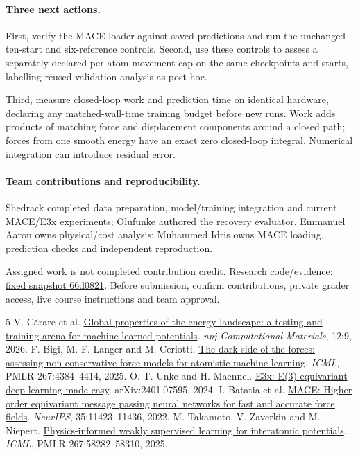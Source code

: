 \documentclass{article}
\begin{document}
\paragraph{Three next actions.}
First, verify the MACE loader against saved predictions and run the unchanged ten-start and six-reference controls. Second, use these controls to assess a separately declared per-atom movement cap on the same checkpoints and starts, labelling reused-validation analysis as post-hoc.

Third, measure closed-loop work and prediction time on identical hardware, declaring any matched-wall-time training budget before new runs. Work adds products of matching force and displacement components around a closed path; forces from one smooth energy have an exact zero closed-loop integral. Numerical integration can introduce residual error.
\paragraph{Team contributions and reproducibility.}
Shedrack completed data preparation, model/training integration and current MACE/E3x experiments; Olufunke authored the recovery evaluator. Emmanuel Aaron owns physical/cost analysis; Muhammed Idris owns MACE loading, prediction checks and independent reproduction.

Assigned work is not completed contribution credit. Research code/evidence: \href{https://github.com/Shedrackeze002/idl-molecular-force-consistency/tree/66d082158100a0c81b9a7815f7ac2a65f155b7ee}{fixed snapshot 66d0821}. Before submission, confirm contributions, private grader access, live course instructions and team approval.
\begin{thebibliography}{5}\small
{} V. C\u{a}rare et al. \href{https://doi.org/10.1038/s41524-025-01878-x}{Global properties of the energy landscape: a testing and training arena for machine learned potentials}. \emph{npj Computational Materials}, 12:9, 2026.
 F. Bigi, M. F. Langer and M. Ceriotti. \href{https://proceedings.mlr.press/v267/bigi25a.html}{The dark side of the forces: assessing non-conservative force models for atomistic machine learning}. \emph{ICML}, PMLR 267:4384--4414, 2025.
 O. T. Unke and H. Maennel. \href{https://arxiv.org/abs/2401.07595}{E3x: E(3)-equivariant deep learning made easy}. arXiv:2401.07595, 2024.
 I. Batatia et al. \href{https://arxiv.org/abs/2206.07697}{MACE: Higher order equivariant message passing neural networks for fast and accurate force fields}. \emph{NeurIPS}, 35:11423--11436, 2022.
 M. Takamoto, V. Zaverkin and M. Niepert. \href{https://proceedings.mlr.press/v267/takamoto25a.html}{Physics-informed weakly supervised learning for interatomic potentials}. \emph{ICML}, PMLR 267:58282--58310, 2025.
\end{thebibliography}
\end{document}
